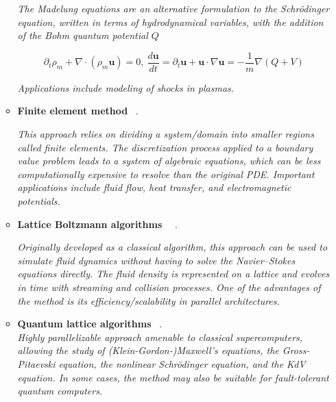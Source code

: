 \documentclass[12pt,letterpaper]{article}
\begin{document}
\begin{itemize}
\begin{itemize}
        \textit{The Madelung equations are an alternative formulation to the Schrödinger equation, written in terms of hydrodynamical variables, with the addition of the Bohm quantum potential $Q$}
        
        $$\partial_t \rho_m+\nabla \cdot\left(\rho_m \mathbf{u}\right)=0, ~\frac{d \mathbf{u}}{d t}=\partial_t \mathbf{u}+\mathbf{u} \cdot \nabla \mathbf{u}=-\frac{1}{m} \nabla(Q+V)$$

        \textit{Applications include modeling of shocks in plasmas.}
    
        \item \textbf{Finite element method}  ~\cite{montanaroQuantumAlgorithmsFinite2016}.
        
        \textit{This approach relies on dividing a system/domain into smaller regions called finite elements. The discretization process applied to a boundary value problem leads to a system of algebraic equations, which can be less computationally expensive to resolve than the original PDE. Important applications include fluid flow, heat transfer, and electromagnetic potentials.}
    
        \item \textbf{Lattice Boltzmann algorithms} ~~\cite{ljubomirQuantumAlgorithmNavier2022}.

        \textit{Originally developed as a classical algorithm, this approach can be used to simulate fluid dynamics without having to solve the Navier–Stokes equations directly. The fluid density is represented on a lattice and evolves in time with streaming and collision processes. One of the advantages of the method is its efficiency/scalability in parallel architectures.}
        
        \item \textbf{Quantum lattice algorithms}  ~\cite{andersonCommentsUnitaryQubit2022,koukoutsisDysonMapsUnitary2022,oganesovEffectFourierTransform2018,ramReflectionTransmissionElectromagnetic2021,vahalaBuildingThreedimensionalQuantum2020,vahalaEffectPauliSpin2020,vahalaOneTwodimensionalQuantum2021,vahalaOneTwodimensionalQuantum2021a,vahalaQuantumLatticeRepresentation2022a,vahalaQubitUnitaryLattice2020,vahalaQubitUnitaryLattice2020a,vahalaTwoDimensionalElectromagnetic2021,vahalaUnitaryQuantumLattice2020,vahalaUnitaryQubitLattice2019,yepezEfficientAccurateQuantum2002,yepezRelativisticPathIntegral2005,yepezQuantumLatticeGas2016,vahalaQuantumLatticeGas2003,vahalaUnitaryQubitLattice2011,vahalaUnitaryQuantumLattice2010,oganesovBenchmarkingDiracgeneratedUnitary2016,oganesovImaginaryTimeIntegration2016,oganesovUnitaryQuantumLattice2015,shiSimulationsRelativisticQuantum2018}.
        \\\textit{Highly parallelizable approach amenable to classical supercomputers, allowing the study of (Klein-Gordon-)Maxwell's equations, the Gross-Pitaevski equation, the nonlinear Schrödinger equation, and the KdV equation. In some cases, the method may also be suitable for fault-tolerant quantum computers.}
    \end{itemize}

\end{itemize}
\newpage
\printbibliography
\end{document}
